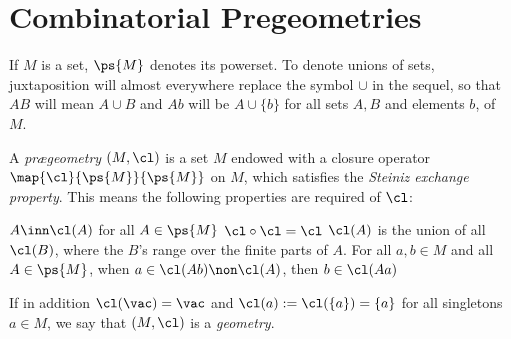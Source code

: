 \section{Combinatorial Pregeometries}\label{qdim}
If $M$ is a set, $\ps{M}$ denotes its powerset.
To denote unions of sets, juxtaposition will almost everywhere replace the symbol $\cup$ in the sequel, so that
$AB$ will mean $A\cup B$ and $Ab$ will be $A\cup\{b\}$ for all sets $A,B$ and elements $b$, of $M$.

%
\begin{dfn}\label{pregdef}
A \emph{pr{\ae}geometry} %
$(M,\cl)$ is a %
set $M$ endowed with a closure operator $\map{\cl}{\ps{M}}{\ps{M}}$ on $M$,
which satisfies the {\em Steiniz exchange property}. This means the following properties are required of $\cl$:
\begin{itemize}
$A\inn\cl(A)$ for all $A\in\ps{M}$
$\cl\circ\cl=\cl$
$\cl(A)$ is the union of all $\cl(B)$, where the $B$'s range over the finite parts of $A$.
For all $a,b\in M$ and all $A\in\ps{M}$, when $a\in\cl(Ab)\non\cl(A)$, then $b\in\cl(Aa)$
\end{itemize}

If in addition $\cl(\vac)=\vac$ and $\cl(a):=\cl(\{a\})=\{a\}$ for all singletons $a\in M$, we say
that $(M,\cl)$ is a {\em geometry}. 
\end{dfn}

